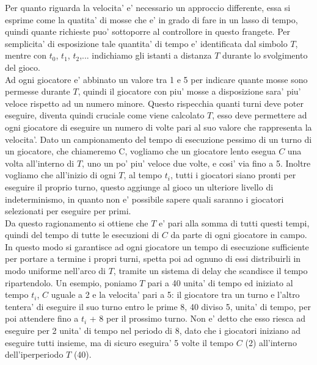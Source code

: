 Per quanto riguarda la velocita' e' necessario un approccio differente, essa si esprime come la quatita' di mosse che e' in grado di fare in un lasso di tempo, quindi quante richieste puo' sottoporre al controllore in questo frangete. Per semplicita' di esposizione tale quantita' di tempo e' identificata dal simbolo $T$, mentre con $t_0$, $t_1$, $t_2$,... indichiamo gli istanti a distanza $T$ durante lo svolgimento del gioco.\\

Ad ogni giocatore e' abbinato un valore tra 1 e 5 per indicare quante mosse sono permesse durante $T$, quindi il giocatore con piu' mosse a disposizione sara' piu' veloce rispetto ad un numero minore. Questo rispecchia quanti turni deve poter eseguire, diventa quindi cruciale come viene calcolato $T$, esso deve permettere ad ogni giocatore di eseguire un numero di volte pari al suo valore che rappresenta la velocita'. Dato un campionamento del tempo di esecuzione pessimo di un turno di un giocatore, che chiameremo C, vogliamo che un giocatore lento esegua $C$ una volta all'interno di $T$, uno un po' piu' veloce due volte, e cosi' via fino a 5. Inoltre vogliamo che all'inizio di ogni $T$, al tempo $t_i$, tutti i giocatori siano pronti per eseguire il proprio turno, questo aggiunge al gioco un ulteriore livello di indeterminismo, in quanto non e' possibile sapere quali saranno i giocatori selezionati per eseguire per primi.\\

Da questo ragionamento si ottiene che $T$ e' pari alla somma di tutti questi tempi, quindi del tempo di tutte le esecuzioni di $C$ da parte di ogni giocatore in campo. In questo modo si garantisce ad ogni giocatore un tempo di esecuzione sufficiente per portare a termine i propri turni, spetta poi ad ognuno di essi distribuirli in modo uniforme nell'arco di $T$, tramite un sistema di delay che scandisce il tempo ripartendolo. Un esempio, poniamo $T$ pari a 40 unita' di tempo ed iniziato al tempo $t_i$, $C$ uguale a 2 e la velocita' pari a 5: il giocatore tra un turno e l'altro tentera' di eseguire il suo turno entro le prime 8, 40 diviso 5, unita' di tempo, per poi attendere fino a $t_i$ + 8 per il prossimo turno. Non e' detto che esso riesca ad eseguire per 2 unita' di tempo nel periodo di 8, dato che i giocatori iniziano ad eseguire tutti insieme, ma di sicuro eseguira' 5 volte il tempo $C$ (2) all'interno dell'iperperiodo $T$ (40).\\

